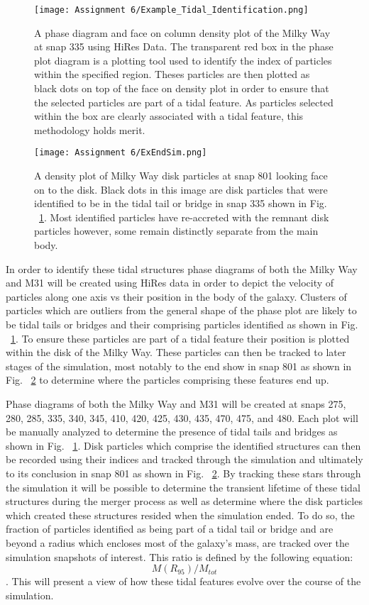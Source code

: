 \documentclass[fleqn,usenatbib]{mnras}
\begin{document}
\begin{figure}
    \texttt{[image: Assignment 6/Example\_Tidal\_Identification.png]}
    \caption{A phase diagram and face on column density plot of the Milky Way at snap 335 using HiRes Data. The transparent red box in the phase plot diagram is a plotting tool used to identify the index of particles within the specified region. Theses particles are then plotted as black dots on top of the face on density plot in order to ensure that the selected particles are part of a tidal feature. As particles selected within the box are clearly associated with a tidal feature, this methodology holds merit.}
    \label{fig:ExTracked_Stars}
\end{figure}

\begin{figure}
    \texttt{[image: Assignment 6/ExEndSim.png]}
    \caption{A density plot of Milky Way disk particles at snap 801 looking face on to the disk. Black dots in this image are disk particles that were identified to be in the tidal tail or bridge in snap 335 shown in Fig. ~\ref{fig:ExTracked_Stars}. Most identified particles have re-accreted with the remnant disk particles however, some remain distinctly separate from the main body.}
    \label{fig:ExEndsim}
\end{figure}

In order to identify these tidal structures phase diagrams of both the Milky Way and M31 will be created using HiRes data in order to depict the velocity of particles along one axis vs their position in the body of the galaxy. Clusters of particles which are outliers from the general shape of the phase plot are likely to be tidal tails or bridges and their comprising particles identified as shown in Fig. ~\ref{fig:ExTracked_Stars}. To ensure these particles are part of a tidal feature their position is plotted within the disk of the Milky Way. These particles can then be tracked to later stages of the simulation, most notably to the end show in snap 801 as shown in Fig. ~\ref{fig:ExEndsim} to determine where the particles comprising these features end up.

 Phase diagrams of both the Milky Way and M31 will be created at snaps 275, 280, 285, 335, 340, 345, 410, 420, 425, 430, 435, 470, 475, and 480. Each plot will be manually analyzed to determine the presence of tidal tails and bridges as shown in Fig. ~\ref{fig:ExTracked_Stars}. Disk particles which comprise the identified structures can then be recorded using their indices and tracked through the simulation and ultimately to its conclusion in snap 801 as shown in Fig. ~\ref{fig:ExEndsim}. By tracking these stars through the simulation it will be possible to determine the transient lifetime of these tidal structures during the merger process as well as determine where the disk particles which created these structures resided when the simulation ended. To do so, the fraction of particles identified as being part of a tidal tail or bridge and are beyond a radius which encloses most of the galaxy's mass, are tracked over the simulation snapshots of interest. This ratio is defined by the following equation: \[M(R_{95})/M_{tot}\]. This will present a view of how these tidal features evolve over the course of the simulation.
\end{document}
